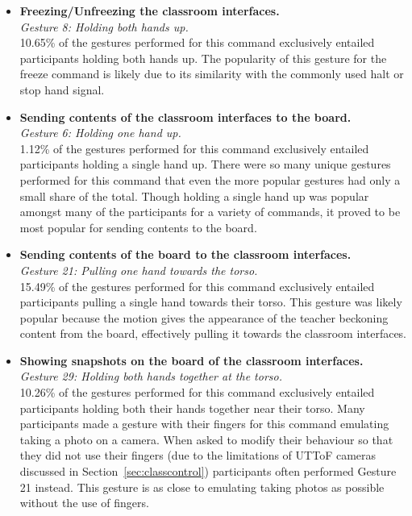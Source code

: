 \documentclass[manuscript, review, screen]{acmart}
\begin{document}
\begin{itemize}
\item \textbf{Freezing/Unfreezing the classroom interfaces.}\\
\textit{Gesture 8: Holding both hands up.}\\  
10.65\% of the gestures performed for this command exclusively entailed participants holding both hands up.
The popularity of this gesture for the freeze command is likely due to its similarity with the commonly used halt or stop hand signal.\\

\item \textbf{Sending contents of the classroom interfaces to the board.}\\
\textit{Gesture 6: Holding one hand up.}\\
1.12\% of the gestures performed for this command exclusively entailed participants holding a single hand up.
There were so many unique gestures performed for this command that even the more popular gestures had only a small share of the total.
Though holding a single hand up was popular amongst many of the participants for a variety of commands, it proved to be most popular for sending contents to the board.\\

\item \textbf{Sending contents of the board to the classroom interfaces.}\\
\textit{Gesture 21: Pulling one hand towards the torso.}\\
15.49\% of the gestures performed for this command exclusively entailed participants pulling a single hand towards their torso.
This gesture was likely popular because the motion gives the appearance of the teacher beckoning content from the board, effectively pulling it towards the classroom interfaces.\\

\item \textbf{Showing snapshots on the board of the classroom interfaces.}\\
\textit{Gesture 29: Holding both hands together at the torso.}\\
10.26\% of the gestures performed for this command exclusively entailed participants holding both their hands together near their torso.
Many participants made a gesture with their fingers for this command emulating taking a photo on a camera.
When asked to modify their behaviour so that they did not use their fingers (due to the limitations of \ac{UTToF} cameras discussed in Section~\ref{sec:classcontrol}) participants often performed Gesture 21 instead.
This gesture is as close to emulating taking photos as possible without the use of fingers.\\


\end{itemize}
\end{document}
